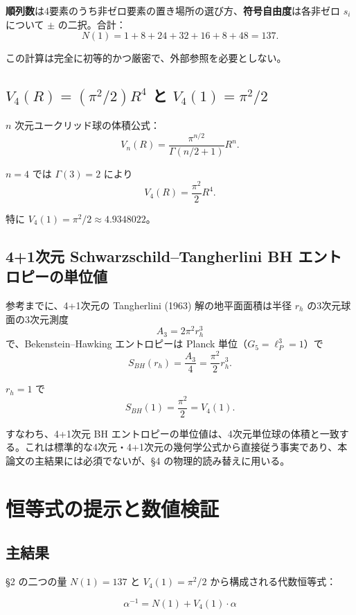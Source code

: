 \documentclass[a4paper,11pt]{ltjsarticle}
\begin{document}
\textbf{順列数}は4要素のうち非ゼロ要素の置き場所の選び方、\textbf{符号自由度}は各非ゼロ $s_i$ について $\pm$ の二択。合計：
\[ N(1) = 1 + 8 + 24 + 32 + 16 + 8 + 48 = \boxed{137}. \]

この計算は完全に初等的かつ厳密で、外部参照を必要としない。

\subsection{$V_4(R) = (\pi^2/2) R^4$ と $V_4(1) = \pi^2/2$}

$n$ 次元ユークリッド球の体積公式：
\[ V_n(R) = \frac{\pi^{n/2}}{\Gamma(n/2 + 1)} R^n. \]

$n = 4$ では $\Gamma(3) = 2$ により
\[ V_4(R) = \frac{\pi^2}{2} R^4. \]

特に $V_4(1) = \pi^2/2 \approx 4.9348022$。

\subsection{4+1次元 Schwarzschild--Tangherlini BH エントロピーの単位値}

参考までに、4+1次元の Tangherlini (1963) 解の地平面面積は半径 $r_h$ の3次元球面の3次元測度
\[ A_3 = 2\pi^2 r_h^3 \]
で、Bekenstein--Hawking エントロピーは Planck 単位（$G_5 = \ell_P^3 = 1$）で
\[ S_{BH}(r_h) = \frac{A_3}{4} = \frac{\pi^2}{2} r_h^3. \]

$r_h = 1$ で
\[ S_{BH}(1) = \frac{\pi^2}{2} = V_4(1). \]

すなわち、4+1次元 BH エントロピーの単位値は、4次元単位球の体積と一致する。これは標準的な4次元・4+1次元の幾何学公式から直接従う事実であり、本論文の主結果には必須でないが、§4 の物理的読み替えに用いる。

\section{恒等式の提示と数値検証}

\subsection{主結果}

§2 の二つの量 $N(1) = 137$ と $V_4(1) = \pi^2/2$ から構成される代数恒等式：

\begin{equation}
\boxed{\; \alpha^{-1} = N(1) + V_4(1) \cdot \alpha \;} \tag{1}
\end{equation}
\end{document}
